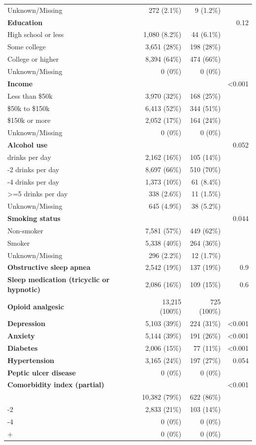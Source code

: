 \documentclass[11pt]{article}
\begin{document}
\begin{longtable}{@{}p{6.0cm}rrr@{}}
\quad Unknown/Missing & 272 (2.1\%) & 9 (1.2\%) &  \\
\textbf{Education} &  &  & 0.12 \\
\quad High school or less & 1,080 (8.2\%) & 44 (6.1\%) &  \\
\quad Some college & 3,651 (28\%) & 198 (28\%) &  \\
\quad College or higher & 8,394 (64\%) & 474 (66\%) &  \\
\quad Unknown/Missing & 0 (0\%) & 0 (0\%) &  \\
\textbf{Income} &  &  & <0.001 \\
\quad Less than \$50k & 3,970 (32\%) & 168 (25\%) &  \\
\quad \$50k to \$150k & 6,413 (52\%) & 344 (51\%) &  \\
\quad \$150k or more & 2,052 (17\%) & 164 (24\%) &  \\
\quad Unknown/Missing & 0 (0\%) & 0 (0\%) &  \\
\textbf{Alcohol use} &  &  & 0.052 \\
\quad 0 drinks per day & 2,162 (16\%) & 105 (14\%) &  \\
\quad 1-2 drinks per day & 8,697 (66\%) & 510 (70\%) &  \\
\quad 3-4 drinks per day & 1,373 (10\%) & 61 (8.4\%) &  \\
\quad >=5 drinks per day & 338 (2.6\%) & 11 (1.5\%) &  \\
\quad Unknown/Missing & 645 (4.9\%) & 38 (5.2\%) &  \\
\textbf{Smoking status} &  &  & 0.044 \\
\quad Non-smoker & 7,581 (57\%) & 449 (62\%) &  \\
\quad Smoker & 5,338 (40\%) & 264 (36\%) &  \\
\quad Unknown/Missing & 296 (2.2\%) & 12 (1.7\%) &  \\
\textbf{Obstructive sleep apnea} & 2,542 (19\%) & 137 (19\%) & 0.9 \\
\textbf{Sleep medication (tricyclic or hypnotic)} & 2,086 (16\%) & 109 (15\%) & 0.6 \\
\textbf{Opioid analgesic} & 13,215 (100\%) & 725 (100\%) &  \\
\textbf{Depression} & 5,103 (39\%) & 224 (31\%) & <0.001 \\
\textbf{Anxiety} & 5,144 (39\%) & 191 (26\%) & <0.001 \\
\textbf{Diabetes} & 2,006 (15\%) & 77 (11\%) & <0.001 \\
\textbf{Hypertension} & 3,165 (24\%) & 197 (27\%) & 0.054 \\
\textbf{Peptic ulcer disease} & 0 (0\%) & 0 (0\%) &  \\
\textbf{Comorbidity index (partial)} &  &  & <0.001 \\
\quad 0 & 10,382 (79\%) & 622 (86\%) &  \\
\quad 1-2 & 2,833 (21\%) & 103 (14\%) &  \\
\quad 3-4 & 0 (0\%) & 0 (0\%) &  \\
\quad 5+ & 0 (0\%) & 0 (0\%) &  \\
\bottomrule \end{longtable}
\end{document}
